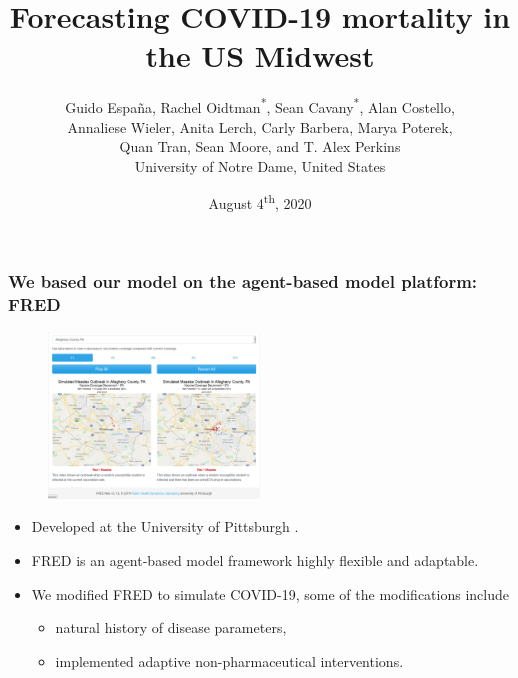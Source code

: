 \documentclass[usenames,dvipsnames]{beamer}
\title{Forecasting COVID-19 mortality in the US Midwest}
\author{Guido Espa\~na,  Rachel Oidtman\textsuperscript{*}, Sean Cavany\textsuperscript{*}, Alan Costello, \\Annaliese Wieler, Anita Lerch, Carly Barbera,  Marya Poterek,\\ Quan Tran, Sean Moore, and T. Alex Perkins\\
University of Notre Dame, United States
}
\institute{University of Notre Dame}
\date{August 4\textsuperscript{th}, 2020}
\begin{document}
\begin{frame}
  \titlepage
\end{frame}

\begin{frame}
  \frametitle{We based our model on the agent-based model platform: FRED}
  \begin{figure}
    \includegraphics[width=0.5\textwidth]{./images/FRED_website.png}
  \end{figure}
  \begin{itemize}
  \item Developed at the University of Pittsburgh \citep{grefenstette2013}. 
  \item FRED is an agent-based model framework highly flexible and adaptable.
  \item We modified FRED to simulate COVID-19, some of the modifications include
    \begin{itemize}
      \item natural history of disease parameters,
      \item implemented adaptive non-pharmaceutical interventions.
    \end{itemize}
  \end{itemize}
    
\end{frame}
\end{document}
